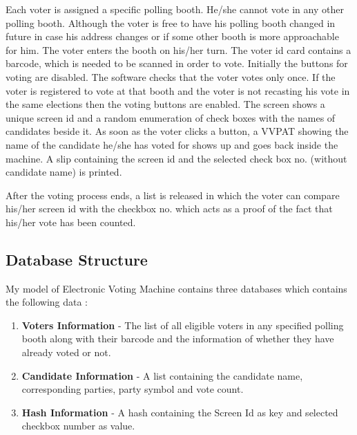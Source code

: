 \documentclass[11pt]{article}
\begin{document}
    Each voter is assigned a specific polling booth. He/she cannot vote in any other polling booth. Although the voter is free to have his polling booth changed in future in case his address changes or if some other booth is more approachable for him. The voter enters the booth on his/her turn. The voter id card contains a barcode, which is needed to be scanned in order to vote. Initially the buttons for voting are disabled. The software checks that the voter votes only once. If the voter is registered to vote at that booth and the voter is not recasting his vote in the same elections then the voting buttons are enabled. The screen shows a unique screen id and a random enumeration of check boxes with the names of candidates beside it. As soon as the voter clicks a button, a VVPAT showing the name of the candidate he/she has voted for shows up and goes back inside the machine. A slip containing the screen id and the selected check box no. (without candidate name) is printed.

    \newline

    After the voting process ends, a list is released in which the voter can compare his/her screen id with the checkbox no. which acts as a proof of the fact that his/her vote has been counted.
    
    \subsection{Database Structure}
    
    My model of Electronic Voting Machine contains three databases which contains the following data :

    \newline
    
    \begin{enumerate}
    	\item \textbf{Voters Information} - The list of all eligible voters in any specified polling booth along with their barcode and the information of whether they have already voted or not.
    	\item \textbf{Candidate Information} - A list containing the candidate name, corresponding parties, party symbol and vote count.
    	\item \textbf{Hash Information} - A hash containing the Screen Id as key and selected checkbox number as value.
    \end{enumerate}
\end{document}
